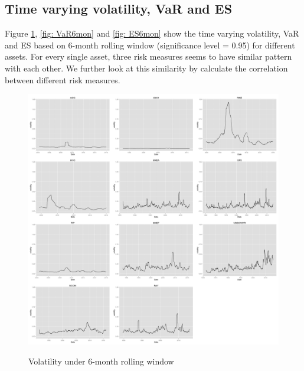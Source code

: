 \fi

\subsection{Time varying volatility, VaR and ES}

Figure \ref{fig: variance6mon}, \ref{fig: VaR6mon} and \ref{fig: ES6mon} show the time varying volatility, VaR and ES based on 6-month rolling window (significance level = 0.95) for different assets. For every single asset, three risk measures seems to have similar pattern with each other. We further look at this similarity by calculate the correlation between different risk measures.

\iffalse

\begin{figure}[h]
\caption{Volatility under 6-month rolling window} 
\centering 
\includegraphics[width=15cm]{../results/volatility6mon}
\label{fig: variance6mon}
\end{figure}

